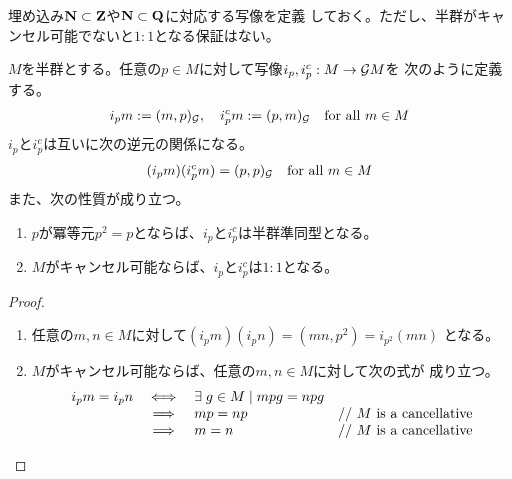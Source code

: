 	埋め込み$\mathbf{N}\subset\mathbf{Z}$や$\mathbf{N}\subset\mathbf{Q}$に対応する写像を定義
	しておく。ただし、半群がキャンセル可能でないと$1:1$となる保証はない。

	\begin{proposition}[グロタンディーク群への埋込み]
	\label{グロタンディーク群への埋込み} %
		$M$を半群とする。任意の$p\in M$に対して写像$i_p,i_p^c:M\to{\ensuremath{{\mathcal{G}}}} M$を
		次のように定義する。
		\begin{equation*}\begin{split}
			i_pm := (m,p)_{{\mathcal{G}}},\quad i_p^cm := (p,m)_{{\mathcal{G}}}
			\quad\text{for all }m\in M
		\end{split}\end{equation*}
		$i_p$と$i_p^c$は互いに次の逆元の関係になる。
		\begin{equation*}\begin{split}
			(i_pm)(i_p^cm) = (p,p)_{{\mathcal{G}}} \quad\text{for all }m\in M
		\end{split}\end{equation*}
		また、次の性質が成り立つ。
		\begin{enumerate}\setlength{\itemsep}{-1mm} %
			\item $p$が冪等元$p^2=p$とならば、$i_p$と$i_p^c$は半群準同型となる。
			\item $M$がキャンセル可能ならば、$i_p$と$i_p^c$は$1:1$となる。
		\end{enumerate} %
	\end{proposition} %
	\begin{proof} \quad
		\begin{enumerate}\setlength{\itemsep}{-1mm} %
			\item 任意の$m,n\in M$に対して$(i_pm)(i_pn)=(mn,p^2)=i_{p^2}(mn)$
			となる。
			\item $M$がキャンセル可能ならば、任意の$m,n\in M$に対して次の式が
			成り立つ。
			{\setlength\arraycolsep{2pt}
			\begin{equation*}\begin{array}{rcll}
				i_pm = i_pn &\iff& \exists\; g\in M\;\vert\; mpg = npg \\
				&\implies& mp = np & \text{// $M$ is a cancellative} \\
				&\implies& m = n & \text{// $M$ is a cancellative} \\
			\end{array}\end{equation*}
			}
		\end{enumerate} %
	\end{proof}

